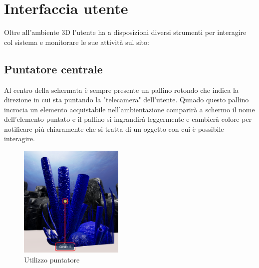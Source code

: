 \pagebreak

\section{Interfaccia utente}
Oltre all'ambiente 3D l'utente ha a disposizioni diversi strumenti per interagire col sistema e monitorare le sue attività sul sito:
\subsection{Puntatore centrale}
Al centro della schermata è sempre presente un pallino rotondo che indica la direzione in cui sta puntando la "telecamera" dell'utente. Qunado questo pallino incrocia un elemento acquistabile nell'ambientazione comparirà a schermo il nome dell'elemento puntato e il pallino si ingrandirà leggermente e cambierà colore per notificare più chiaramente che si tratta di un oggetto con cui è possibile interagire.
\begin{figure}
  \renewcommand{\thefigure}{3}
\begin{center}
  \includegraphics[width=5cm]{./res/images/puntatore.png}
 \end{center}
 \caption{Utilizzo puntatore}
  \label{Utilizzo puntatore}
\end{figure}


